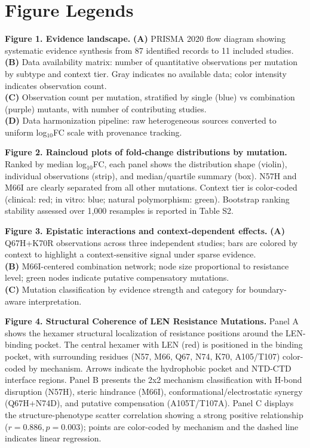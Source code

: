 \documentclass[12pt,a4paper]{article}
\begin{document}
\newpage
\section*{Figure Legends}

\textbf{Figure 1. Evidence landscape.}
\textbf{(A)} PRISMA 2020 flow diagram showing systematic evidence synthesis from 87 identified records to 11 included studies.\\
\textbf{(B)} Data availability matrix: number of quantitative observations per mutation by subtype and context tier. Gray indicates no available data; color intensity indicates observation count.\\
\textbf{(C)} Observation count per mutation, stratified by single (blue) vs combination (purple) mutants, with number of contributing studies.\\
\textbf{(D)} Data harmonization pipeline: raw heterogeneous sources converted to uniform log$_{10}$FC scale with provenance tracking.

\textbf{Figure 2. Raincloud plots of fold-change distributions by mutation.}
Ranked by median log$_{10}$FC, each panel shows the distribution shape (violin), individual observations (strip), and median/quartile summary (box). N57H and M66I are clearly separated from all other mutations. Context tier is color-coded (clinical: red; in vitro: blue; natural polymorphism: green). Bootstrap ranking stability assessed over 1,000 resamples is reported in Table S2.

\textbf{Figure 3. Epistatic interactions and context-dependent effects.}
\textbf{(A)} Q67H+K70R observations across three independent studies; bars are colored by context to highlight a context-sensitive signal under sparse evidence.\\
\textbf{(B)} M66I-centered combination network; node size proportional to resistance level; green nodes indicate putative compensatory mutations.\\
\textbf{(C)} Mutation classification by evidence strength and category for boundary-aware interpretation.

\textbf{Figure 4. Structural Coherence of LEN Resistance Mutations.}
Panel A shows the hexamer structural localization of resistance positions around the LEN-binding pocket. The central hexamer with LEN (red) is positioned in the binding pocket, with surrounding residues (N57, M66, Q67, N74, K70, A105/T107) color-coded by mechanism. Arrows indicate the hydrophobic pocket and NTD-CTD interface regions. Panel B presents the 2x2 mechanism classification with H-bond disruption (N57H), steric hindrance (M66I), conformational/electrostatic synergy (Q67H+N74D), and putative compensation (A105T/T107A). Panel C displays the structure-phenotype scatter correlation showing a strong positive relationship ($r = 0.886, p = 0.003$); points are color-coded by mechanism and the dashed line indicates linear regression.
\end{document}
